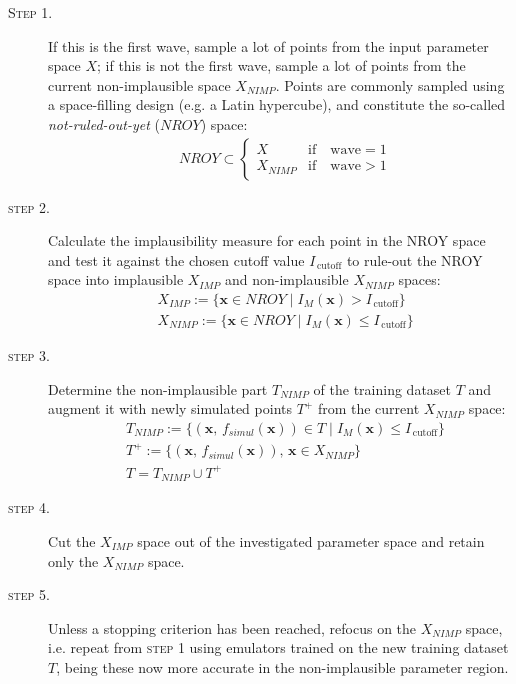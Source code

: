 \begin{description}
    \item[\textsc{Step 1.}] If this is the first wave, sample a lot of points from the input parameter space $X$; if this is not the first wave, sample a lot of points from the current non-implausible space $X_{NIMP}$. Points are commonly sampled using a space-filling design (e.g. a Latin hypercube), and constitute the so-called \textit{not-ruled-out-yet} ($NROY$) space:
    \begin{align*}
        & NROY\subset\begin{cases}
        X &\text{if}\quad \text{wave}=1 \\
        X_{NIMP} &\text{if}\quad \text{wave}>1
        \end{cases}
    \end{align*} 
    \item[\textsc{step 2.}] Calculate the implausibility measure for each point in the NROY space and test it against the chosen cutoff value $I_{\,\text{cutoff}}$ to rule-out the NROY space into implausible $X_{IMP}$ and non-implausible $X_{NIMP}$ spaces:
    \begin{align*}
        & X_{IMP} := \{\mathbf{x}\in NROY\;\vert\;I_{M}(\mathbf{x}) > I_{\,\text{cutoff}}\} \\
        & X_{NIMP} := \{\mathbf{x}\in NROY\;\vert\;I_{M}(\mathbf{x}) \le I_{\,\text{cutoff}}\}
    \end{align*}
    \item[\textsc{step 3.}] Determine the non-implausible part $T_{NIMP}$ of the training dataset $T$ and augment it with newly simulated points $T^{+}$ from the current $X_{NIMP}$ space:
    \begin{align*}
        & T_{NIMP} := \{(\mathbf{x},\,f_{simul}(\mathbf{x}))\in T\;\vert\;I_{M}(\mathbf{x}) \le I_{\,\text{cutoff}}\} \\
        & T^{+} := \{(\mathbf{x},\,f_{simul}(\mathbf{x})),\,\mathbf{x}\in X_{NIMP}\} \\
        & T = T_{NIMP}\cup T^{+}
    \end{align*}
    \item[\textsc{step 4.}] Cut the $X_{IMP}$ space out of the investigated parameter space and retain only the $X_{NIMP}$ space.
    \item[\textsc{step 5.}] Unless a stopping criterion has been reached, refocus on the $X_{NIMP}$ space, i.e. repeat from \textsc{step 1} using emulators trained on the new training dataset $T$, being these now more accurate in the non-implausible parameter region.
\end{description}

